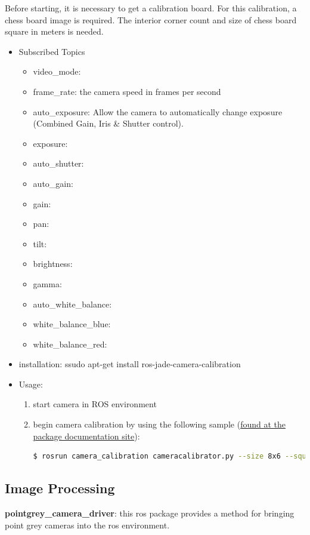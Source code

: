 \noindent Before starting, it is necessary to get a calibration board. For this calibration, a chess board image is required. The interior corner count and size of chess board square in meters is needed.
\begin{itemize}
\item Subscribed Topics
\begin{itemize}
\item video\_mode:
\item frame\_rate:  the camera speed in frames per second
\item auto\_exposure:  Allow the camera to automatically change exposure (Combined Gain, Iris \& Shutter control).
\item exposure: 
\item auto\_shutter:
\item auto\_gain:
\item gain:
\item pan:
\item tilt:
\item brightness:
\item gamma:
\item auto\_white\_balance:
\item white\_balance\_blue:
\item white\_balance\_red:
\end{itemize}
\item installation: ssudo apt-get install ros-jade-camera-calibration
\item Usage:
\begin{enumerate}
\item start camera in ROS environment
\item begin camera calibration by using the following sample (\href{http://wiki.ros.org/camera_calibration}{found at the package documentation site}):
\begin{lstlisting}[language=bash]
$ rosrun camera_calibration cameracalibrator.py --size 8x6 --square 0.108 image:=/my_camera/image camera:=/my_camera
\end{lstlisting}
\end{enumerate}
\end{itemize}

\subsection{Image Processing}
\noindent \textbf{pointgrey\_camera\_driver}: this ros package provides a method for bringing point grey cameras into the ros environment. 

